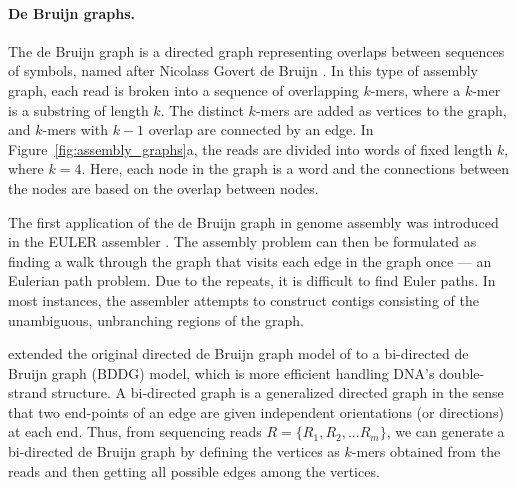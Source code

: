 \paragraph{De Bruijn graphs.}
The de Bruijn graph is a directed graph representing overlaps
between sequences of symbols, named after Nicolass Govert de Bruijn \citep{todd1933combinatorial}. 
In this type of assembly graph, each read is broken into a sequence of overlapping $k$-mers, where a $k$-mer is a substring of length $k$. The distinct
$k$-mers are added as vertices to the graph, and $k$-mers with $k-1$ overlap are connected by an edge.
In Figure~\ref{fig:assembly_graphs}a, the reads are divided into words of fixed length $k$, where $k=4$. Here,
each node in the graph is a word and the connections between the nodes are based on the overlap between nodes.


The first application of the de Bruijn graph in genome assembly was introduced in
the EULER assembler \citep{pevzner2001eulerian}. 
The assembly problem can then be formulated as finding a walk
through the graph that visits each edge in the graph once --- an Eulerian path problem.
Due to the repeats, it is difficult to find Euler paths. 
In most instances, the assembler attempts to construct
contigs consisting of the unambiguous, unbranching regions of the graph.

\cite{medvedev2007computability}
extended the original directed 
de  Bruijn  graph  model  of  \cite{pevzner2001eulerian}  to  a  bi-directed  
de  Bruijn  graph  (BDDG)  model,  which  is  more  efficient  
handling DNA’s double-strand structure.  
A bi-directed graph is a generalized directed graph in the 
sense  that  two  end-points  of an  edge  are  given  independent  
orientations  (or  directions)  at   each  end. 
 Thus,  from  sequencing  reads $ R  =  \{R_1,  R_2,  ...  R_m\}$,  we  can  
generate a bi-directed de Bruijn graph by defining the 
vertices  as  $k$-mers  obtained  
from  the  reads  and  then  getting  
all possible edges among the vertices. 


